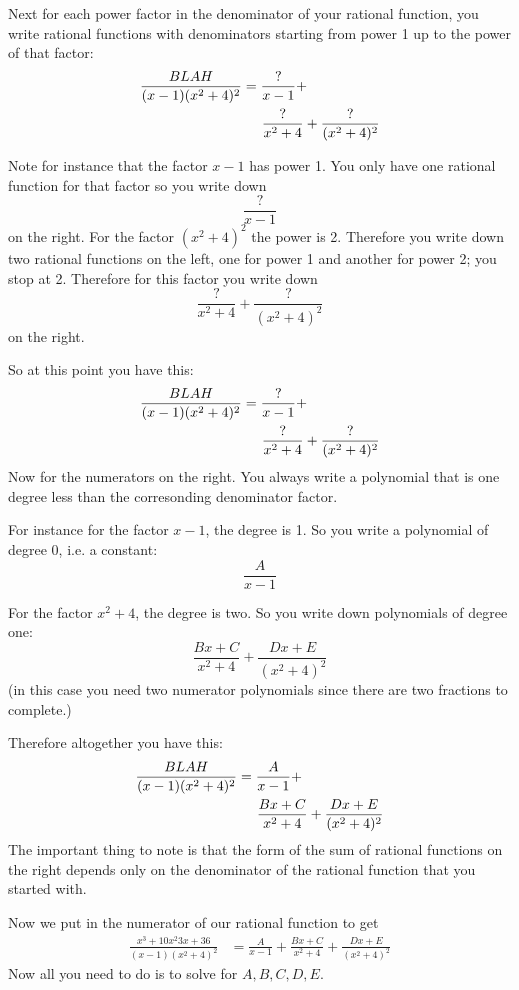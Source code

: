 Next for each power factor in the denominator
of your rational function, you write rational
functions with denominators
starting from power 1 up to the power of that factor:
\begin{align*}
\frac{BLAH}{(x - 1)(x^2 + 4)^2}
&=
\frac{?}{x - 1} + \\
&\hskip 0.5cm \frac{?}{x^2 + 4} + \frac{?}{(x^2 + 4)^2} 
\end{align*}

Note for instance that the factor $x - 1$
has power 1.
You only have one rational function for that factor so you write down
\[
\frac{?}{x - 1}
\]
on the right.
For the factor $(x^2 + 4)^2$ the power is 2.
Therefore you write down two rational functions on the left,
one for power 1 and another for power 2;
you stop at 2.
Therefore for this factor you write down
\[
\frac{?}{x^2 + 4} + \frac{?}{(x^2 + 4)^2}
\]
on the right.

So at this point you have this:
\begin{align*}
\frac{BLAH}{(x - 1)(x^2 + 4)^2}
&=
\frac{?}{x - 1} + \\
&\hskip 0.5cm \frac{?}{x^2 + 4} + \frac{?}{(x^2 + 4)^2} 
\end{align*}
Now for the numerators on the right.
You always write a polynomial that is one degree
less than the corresonding denominator factor.

For instance for the factor $x - 1$,
the degree is 1.
So you write a polynomial of degree 0, i.e. a constant:
\[
\frac{A}{x - 1}
\]

For the factor $x^2 + 4$, the degree is two.
So you write down polynomials of degree one:
\[
\frac{Bx + C}{x^2 + 4} + \frac{Dx + E}{(x^2 + 4)^2} 
\]
(in this case you need two numerator polynomials since
there are two fractions to complete.)

Therefore altogether you have this:
\begin{align*}
\frac{BLAH}{(x - 1)(x^2 + 4)^2}
&=
\frac{A}{x - 1} + \\
&\hskip 0.5cm \frac{Bx + C}{x^2 + 4} + \frac{Dx + E}{(x^2 + 4)^2} 
\end{align*}
The important thing to note is that the form of the 
sum of rational functions on the right
depends only on the denominator of the rational function
that you started with.

Now we put in the numerator of our rational function to get
\begin{align*}
\frac{x^3 + 10x^2  3x + 36}{(x - 1)(x^2 + 4)^2}
&=
\frac{A}{x - 1} +
\frac{Bx + C}{x^2 + 4} + \frac{Dx + E}{(x^2 + 4)^2}
\end{align*}
Now all you need to do is to solve for $A, B, C, D, E$.

